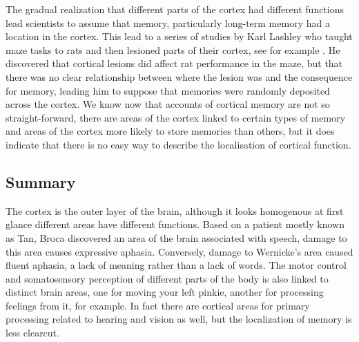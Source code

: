 \documentclass[12pt]{article}
\begin{document}
The gradual realization that different parts of the cortex had
different functions lead scientists to assume that memory,
particularly long-term memory had a location in the cortex. This lead
to a series of studies by Karl Lashley who taught maze tasks to rats
and then lesioned parts of their cortex, see for example
\cite{Lashley1950}. He discovered that cortical lesions did affect rat
performance in the maze, but that there was no clear relationship
between where the lesion was and the consequence for memory, leading
him to suppose that memories were randomly deposited across the
cortex. We know now that accounts of cortical memory are not so
straight-forward, there are areas of the cortex linked to certain
types of memory and areas of the cortex more likely to store memories
than others, but it does indicate that there is no easy way to
describe the localisation of cortical function.

\subsection*{Summary}

The cortex is the outer layer of the brain, although it looks
homogenous at first glance different areas have different
functions. Based on a patient mostly known as Tan, Broca discovered an
area of the brain associated with speech, damage to this area causes
expressive aphasia. Conversely, damage to Wernicke's area caused
fluent aphasia, a lack of meaning rather than a lack of words. The
motor control and somatosensory perception of different parts of the
body is also linked to distinct brain areas, one for moving your left
pinkie, another for processing feelings from it, for example. In fact
there are cortical areas for primary processing related to hearing and
vision as well, but the localization of memory is less clearcut.


{}
\end{document}
